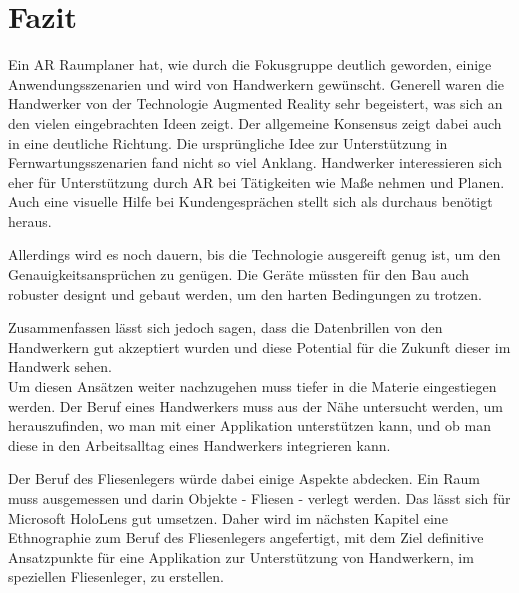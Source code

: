 \section{Fazit}

Ein AR Raumplaner hat, wie durch die Fokusgruppe deutlich geworden, einige Anwendungsszenarien und wird von Handwerkern gewünscht. Generell waren die Handwerker von der Technologie Augmented Reality sehr begeistert, was sich an den vielen eingebrachten Ideen zeigt. Der allgemeine Konsensus zeigt dabei auch in eine deutliche Richtung. Die ursprüngliche Idee zur Unterstützung in Fernwartungsszenarien fand nicht so viel Anklang. Handwerker interessieren sich eher für Unterstützung durch AR bei Tätigkeiten wie Maße nehmen und Planen. Auch eine visuelle Hilfe bei Kundengesprächen stellt sich als durchaus benötigt heraus. 

Allerdings wird es noch dauern, bis die Technologie ausgereift genug ist, um den Genauigkeitsansprüchen zu genügen. Die Geräte müssten für den Bau auch robuster designt und gebaut werden, um den harten Bedingungen zu trotzen. 

Zusammenfassen lässt sich jedoch sagen, dass die Datenbrillen von den Handwerkern gut akzeptiert wurden und diese Potential für die Zukunft dieser im Handwerk sehen. \\
Um diesen Ansätzen weiter nachzugehen muss tiefer in die Materie eingestiegen werden. Der Beruf eines Handwerkers muss aus der Nähe untersucht werden, um herauszufinden, wo man mit einer Applikation unterstützen kann, und ob man diese in den Arbeitsalltag eines Handwerkers integrieren kann. 

Der Beruf des Fliesenlegers würde dabei einige Aspekte abdecken. Ein Raum muss ausgemessen und darin Objekte - Fliesen - verlegt werden. Das lässt sich für Microsoft HoloLens gut umsetzen. Daher wird im nächsten Kapitel eine Ethnographie zum Beruf des Fliesenlegers angefertigt, mit dem Ziel definitive Ansatzpunkte für eine Applikation zur Unterstützung von Handwerkern, im speziellen Fliesenleger, zu erstellen.
